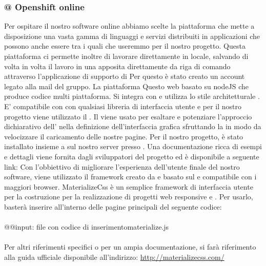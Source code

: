 \documentclass[a4paper,11pt]{article}
\begin{document}
			\subsubsection{@ Openshift online} \label{s:openshift}
			Per ospitare il nostro software online abbiamo scelte la piattaforma \textbf{ } che mette a disposizione una vasta gamma di linguaggi e servizi distribuiti in applicazioni che possono anche essere  tra i quali  che useremmo per il nostro progetto. Questa piattaforma ci permette inoltre di lavorare direttamente in locale, salvando di volta in volta il lavoro in una apposita  direttamente da riga di comando attraverso l'applicazione di supporto di 
			Per questo è stato creato un account legato alla mail del gruppo.
			 \label{s:meteor}
			La piattaforma  Questo  web basato su nodeJS che produce codice  multi piattaforma. Si integra con  e utilizza lo stile architetturale . E' compatibile con con qualsiasi libreria  di interfaccia utente e per il nostro progetto viene utilizzato il  .
			\label{s:angular}
			Il   viene usato per esaltare e potenziare l'approccio dichiarativo dell' nella definizione dell'interfaccia grafica sfruttando la  in modo da velocizzare il caricamento delle nostre pagine. Per il nostro progetto,  è stato installato insieme a  sul nostro server presso . Una documentazione ricca di esempi e dettagli viene fornita dagli sviluppatori del progetto ed è disponibile a seguente link: \url{}
			Con l'obbiettivo di migliorare l'esperienza dell'utente finale del nostro software, viene utilizzato il framework  creato da  e basato sul  e compatibile con i maggiori browser. MaterializeCss è un semplice framework di interfaccia utente  per la costruzione per la realizzazione di progetti web {responsive} e . Per usarlo, basterà inserire all'interno delle pagine  principali del seguente codice: \\
			\\
			 @@input: file con codice di inserimentomaterialize.js
			\\
			\\
			Per altri riferimenti specifici o per un ampia documentazione, si farà riferimento alla guida ufficiale disponibile all'indirizzo: \url{http://materializecss.com/}
\end{document}

